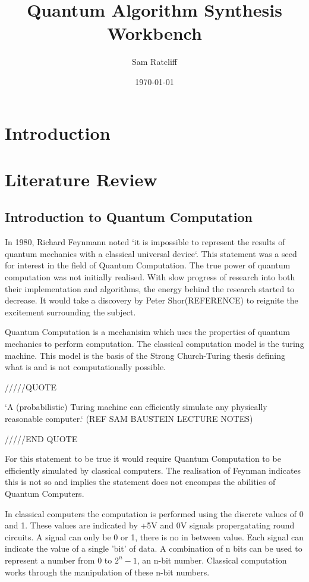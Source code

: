 \documentclass[authoryearcitations]{UoYCSproject}
\author{Sam Ratcliff}
\title{Quantum Algorithm Synthesis Workbench}
\date{\today}
\begin{document}
\maketitle
 
\chapter{Introduction}
\chapter{Literature Review}
\section{Introduction to Quantum Computation}
In 1980, Richard Feynmann noted `it is impossible to represent the results of quantum mechanics with a classical universal device`\cite{Feynman82simulatingphysics}.
This statement was a seed for interest in the field of Quantum Computation.
The true power of quantum computation was not initially realised.
With slow progress of research into both their implementation and algorithms, the energy behind the research started to decrease.
It would take a discovery by Peter Shor(REFERENCE) to reignite the excitement surrounding the subject.  

Quantum Computation is a mechanisim which uses the properties of quantum mechanics to perform computation.
The classical computation model is the turing machine.
This model is the basis of the Strong Church-Turing thesis defining what is and is not computationally possible.

/////QUOTE

`A (probabilistic) Turing machine can efficiently simulate any physically reasonable computer.` (REF SAM BAUSTEIN LECTURE NOTES)

/////END QUOTE

For this statement to be true it would require Quantum Computation to be efficiently simulated by classical computers.
The realisation of Feynman indicates this is not so and implies the statement does not encompas the abilities of Quantum Computers.



In classical computers the computation is performed using the discrete values of 0 and 1.
These values are indicated by +5V and 0V signals propergatating round circuits.
A signal can only be 0 or 1, there is no in between value.
Each signal can indicate the value of a single 'bit' of data.
A combination of n bits can be used to represent a number from $0$ to $2^n-1$, an n-bit number.
Classical computation works through the manipulation of these n-bit numbers.
\end{document}
